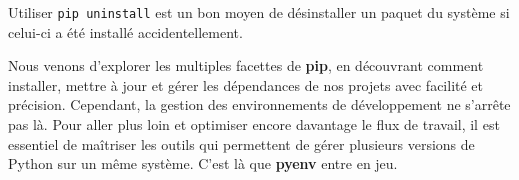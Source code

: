 Utiliser \texttt{pip uninstall} est un bon moyen de désinstaller un paquet  du système si celui-ci a été installé accidentellement.
\bigskip

\begin{center}
\end{center}

Nous venons d'explorer les multiples facettes de \textbf{pip}, en découvrant comment installer, mettre à jour et gérer les dépendances de nos projets avec facilité et précision. Cependant, la gestion des environnements de développement ne s'arrête pas là. Pour aller plus loin et optimiser encore davantage le flux de travail, il est essentiel de maîtriser les outils qui permettent de gérer plusieurs versions de Python sur un même système. C'est là que \textbf{pyenv} entre en jeu. 


